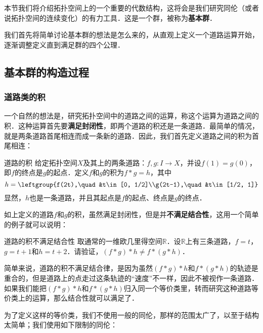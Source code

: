 
本节我们将介绍拓扑空间上的一个重要的代数结构，这将会是我们研究同伦（或者说拓扑空间的连续变化）的有力工具．这是一个群，被称为\textbf{基本群}．

我们首先将简单讨论基本群的想法是怎么来的，从直观上定义一个道路运算开始，逐渐调整定义直到满足群的四个公理．

\subsection{基本群的构造过程}
\subsubsection{道路类的积}

一个自然的想法是，研究拓扑空间中的道路之间的运算，称这个运算为道路之间的积．这种运算首先要\textbf{满足封闭性}，即两个道路的积还是一条道路．最简单的情况，就是两条道路首尾相连而成一条新的道路．因此，我们首先定义道路之间的积为首尾相连：

\begin{definition}{道路的积}
给定拓扑空间$X$及其上的两条道路：$f, g:I\rightarrow X$，并设$f(1)=g(0)$，即$f$的终点是$g$的起点．定义$f$和$g$的积为$f*g=h$，其中\begin{equation}h=\leftgroup{f(2t),\quad &t\in[0, 1/2]\\g(2t-1),\quad &t\in[1/2, 1]}\end{equation}
显然，$h$也是一条道路，并且其起点是$f$的起点、终点是$g$的终点．
\end{definition}

如上定义的道路$f$和$g$的积，虽然满足封闭性，但是并\textbf{不满足结合性}，这用一个简单的例子就可以说明：

\begin{exercise}{道路的积不满足结合性}
取通常的一维欧几里得空间$\mathbb{R}$．设$\mathbb{R}$上有三条道路，$f=t$，$g=t+1$和$h=t+2$．请验证，$(f*g)*h\not=f*(g*h)$．
\end{exercise}

简单来说，道路的积不满足结合律，是因为虽然$(f*g)*h$和$f*(g*h)$的轨迹是重合的，但是道路上的点走过这条轨迹的“速度”不一样，因此不被视作一条道路．如果我们能把$(f*g)*h$和$f*(g*h)$归入同一个等价类里，转而研究这种道路等价类上的运算，那么结合性就可以满足了．

为了定义这样的等价类，我们不使用一般的同伦，那样的范围太广了，以至于结构太简单；我们使用如下限制的同伦：

